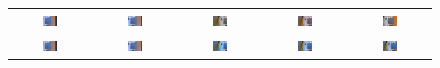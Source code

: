\begin{figure}[H]
\begin{tabular}{ccccc}
\includegraphics[width = 0.2\textwidth]{Chapters/Images/Seq_temp/1}&
\includegraphics[width = 0.2\textwidth]{Chapters/Images/Seq_temp/2}&
\includegraphics[width = 0.2\textwidth]{Chapters/Images/Seq_temp/3}&
\includegraphics[width = 0.2\textwidth]{Chapters/Images/Seq_temp/4}&
\includegraphics[width = 0.2\textwidth]{Chapters/Images/Seq_temp/5}\\

\includegraphics[width = 0.2\textwidth]{Chapters/Images/Seq_temp_stab/1}&
\includegraphics[width = 0.2\textwidth]{Chapters/Images/Seq_temp_stab/2}&
\includegraphics[width = 0.2\textwidth]{Chapters/Images/Seq_temp_stab/3}&
\includegraphics[width = 0.2\textwidth]{Chapters/Images/Seq_temp_stab/4}&
\includegraphics[width = 0.2\textwidth]{Chapters/Images/Seq_temp_stab/5}


\end{tabular}
\end{figure}
